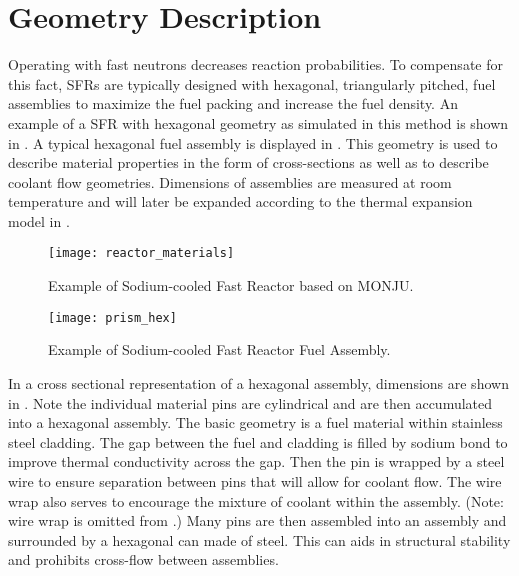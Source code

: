 \section{Geometry Description}
  \label{sec:geometry_description}
  Operating with fast neutrons decreases reaction probabilities. To compensate
  for this fact, SFRs are typically designed with hexagonal,
  triangularly pitched, fuel assemblies to maximize the fuel packing and
  increase the fuel density. An example of a SFR with hexagonal geometry as
  simulated in this method is shown in .
  A typical hexagonal fuel assembly is displayed in .
  This geometry is used to describe material properties in the form of 
  cross-sections as well as to describe coolant flow geometries. Dimensions of 
  assemblies are measured at room temperature and will later be expanded 
  according to the thermal expansion model in .
  
  \begin{figure}
    \centering
    \texttt{[image: reactor\_materials]}
    \caption{Example of Sodium-cooled Fast Reactor based on MONJU.}
    \label{fig:reactor_materials}
  \end{figure}

  \begin{figure}
    \centering
    \texttt{[image: prism\_hex]}
    \caption{Example of Sodium-cooled Fast Reactor Fuel Assembly.}
    \label{fig:prism_hex}
  \end{figure}

  In a cross sectional representation of a hexagonal assembly, dimensions are 
  shown in . 
  Note the individual material pins are cylindrical and are then accumulated
  into a hexagonal assembly. The basic geometry is a fuel material within
  stainless steel cladding. The gap between the fuel and cladding is filled by
  sodium bond to improve thermal conductivity across the gap. Then the pin is
  wrapped by a steel wire to ensure separation between pins that will allow for
  coolant flow. The wire wrap also serves to encourage the mixture of coolant
  within the assembly. (Note: wire wrap is omitted from .) 
  Many pins are then assembled into an assembly and surrounded by a hexagonal 
  can made of steel. This can aids in structural stability and prohibits 
  cross-flow between assemblies. 

